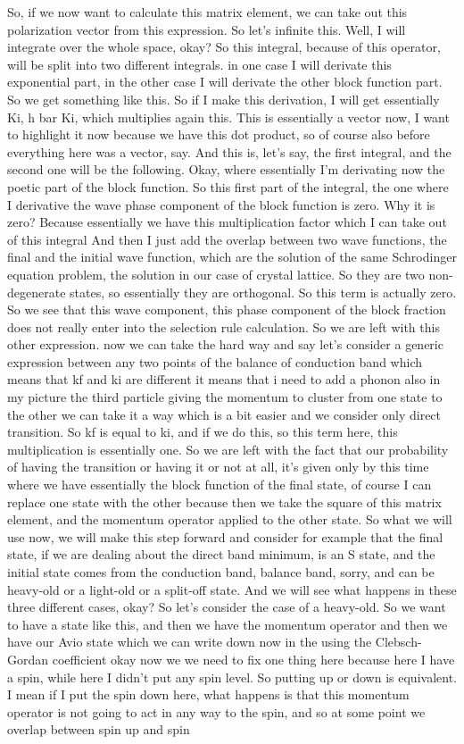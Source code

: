 So, if we now want to calculate this matrix element, we can take out this polarization vector from this expression. So let's infinite this. Well, I will integrate over the whole space, okay? So this integral, because of this operator, will be split into two different integrals. in one case I will derivate this exponential part, in the other case I will derivate the other block function part. So we get something like this. So if I make this derivation, I will get essentially Ki, h bar Ki, which multiplies again this. This is essentially a vector now, I want to highlight it now because we have this dot product, so of course also before everything here was a vector, say. And this is, let's say, the first integral, and the second one will be the following. Okay, where essentially I'm derivating now the poetic part of the block function. So this first part of the integral, the one where I derivative the wave phase component of the block function is zero. Why it is zero? Because essentially we have this multiplication factor which I can take out of this integral And then I just add the overlap between two wave functions, the final and the initial wave function, which are the solution of the same Schrodinger equation problem, the solution in our case of crystal lattice. So they are two non-degenerate states, so essentially they are orthogonal. So this term is actually zero. So we see that this wave component, this phase component of the block fraction does not really enter into the selection rule calculation. So we are left with this other expression. now we can take the hard way and say let's consider a generic expression between any two points of the balance of conduction band which means that kf and ki are different it means that i need to add a phonon also in my picture the third particle giving the momentum to cluster from one state to the other we can take it a way which is a bit easier and we consider only direct transition. So kf is equal to ki, and if we do this, so this term here, this multiplication is essentially one. So we are left with the fact that our probability of having the transition or having it or not at all, it's given only by this time where we have essentially the block function of the final state, of course I can replace one state with the other because then we take the square of this matrix element, and the momentum operator applied to the other state. So what we will use now, we will make this step forward and consider for example that the final state, if we are dealing about the direct band minimum, is an S state, and the initial state comes from the conduction band, balance band, sorry, and can be heavy-old or a light-old or a split-off state. And we will see what happens in these three different cases, okay? So let's consider the case of a heavy-old. So we want to have a state like this, and then we have the momentum operator and then we have our Avio state which we can write down now in the using the Clebsch-Gordan coefficient okay now we we need to fix one thing here because here I have a spin, while here I didn't put any spin level. So putting up or down is equivalent. I mean if I put the spin down here, what happens is that this momentum operator is not going to act in any way to the spin, and so at some point we overlap between spin up and spin 